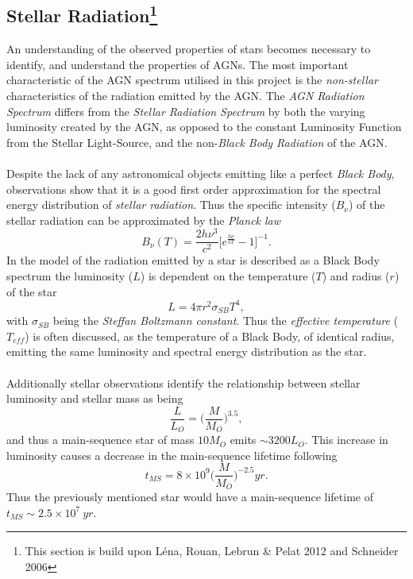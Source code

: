 \documentclass[a4paper, 12pt, twoside]{article}
\begin{document}
\subsection[Stellar radiation]{Stellar Radiation\footnote{This section is build upon Léna, Rouan, Lebrun \& Pelat 2012 and Schneider 2006}}
An understanding of the observed properties of stars becomes necessary to identify, and understand the properties of AGNs. The most important characteristic of the AGN spectrum utilised in this project is the \emph{non-stellar} characteristics of the radiation emitted by the AGN. The \emph{AGN Radiation Spectrum} differs from the \emph{Stellar Radiation Spectrum} by both the varying luminosity created by the AGN, as opposed to the constant Luminosity Function from the Stellar Light-Source, and the non-\emph{Black Body Radiation} of the AGN. \\
\\
Despite the lack of any astronomical objects emitting like a perfect \emph{Black Body}, observations show that it is a good first order approximation for the spectral energy distribution of \emph{stellar radiation}. Thus the specific intensity ($B_{\nu}$) of the stellar radiation can be approximated by the \emph{Planck law} %
\begin{equation}
B_{\nu}(T) = \frac{2h\nu^{3}}{c^{2}}\bigg[e^{\frac{h\nu}{kT}}-1\bigg]^{-1}.
\label{eq:planck}
\end{equation}
In the model of the radiation emitted by a star is described as a Black Body spectrum the luminosity ($L$) is dependent on the temperature ($T$) and radius ($r$) of the star
\begin{equation}
L = 4\pi r^{2}\sigma_{SB}T^{4},
\label{eq:star_L}
\end{equation}
with $\sigma_{SB}$ being the \emph{Steffan Boltzmann constant}. Thus the \emph{effective temperature} ($T_{eff}$) is often discussed, as the temperature of a Black Body, of identical radius, emitting the same luminosity and spectral energy distribution as the star. \\
\\
Additionally stellar observations identify the relationship between stellar luminosity and stellar mass as being
\begin{equation}
\frac{L}{L_{O}} = \bigg(\frac{M}{M_{O}}\bigg)^{3.5},
\label{eq:star_L_M}
\end{equation}
and thus a main-sequence star of mass $10M_{O}$ emits $\sim3200L_{O}$. This increase in luminosity causes a decrease in the main-sequence lifetime following
\begin{equation}
t_{MS} = 8\times 10^{9}\bigg(\frac{M}{M_{O}}\bigg)^{-2.5} yr.
\label{eq:star_ms_life}
\end{equation}
Thus the previously mentioned star would have a main-sequence lifetime of $t_{MS}\sim 2.5\times 10^{7}\ yr$. 
\end{document}
